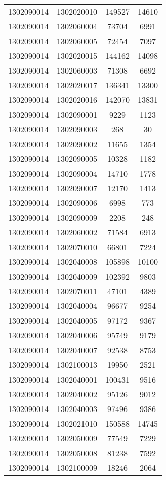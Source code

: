 \begin{longtable}[h]{llcc}
		1302090014 & 1302020010 & 149527 & 14610\\
		1302090014 & 1302060004 & 73704 & 6991\\
		1302090014 & 1302060005 & 72454 & 7097\\
		1302090014 & 1302020015 & 144162 & 14098\\
		1302090014 & 1302060003 & 71308 & 6692\\
		1302090014 & 1302020017 & 136341 & 13300\\
		1302090014 & 1302020016 & 142070 & 13831\\
		1302090014 & 1302090001 & 9229 & 1123\\
		1302090014 & 1302090003 & 268 & 30\\
		1302090014 & 1302090002 & 11655 & 1354\\
		1302090014 & 1302090005 & 10328 & 1182\\
		1302090014 & 1302090004 & 14710 & 1778\\
		1302090014 & 1302090007 & 12170 & 1413\\
		1302090014 & 1302090006 & 6998 & 773\\
		1302090014 & 1302090009 & 2208 & 248\\
		1302090014 & 1302060002 & 71584 & 6913\\
		1302090014 & 1302070010 & 66801 & 7224\\
		1302090014 & 1302040008 & 105898 & 10100\\
		1302090014 & 1302040009 & 102392 & 9803\\
		1302090014 & 1302070011 & 47101 & 4389\\
		1302090014 & 1302040004 & 96677 & 9254\\
		1302090014 & 1302040005 & 97172 & 9367\\
		1302090014 & 1302040006 & 95749 & 9179\\
		1302090014 & 1302040007 & 92538 & 8753\\
		1302090014 & 1302100013 & 19950 & 2521\\
		1302090014 & 1302040001 & 100431 & 9516\\
		1302090014 & 1302040002 & 95126 & 9012\\
		1302090014 & 1302040003 & 97496 & 9386\\
		1302090014 & 1302021010 & 150588 & 14745\\
		1302090014 & 1302050009 & 77549 & 7229\\
		1302090014 & 1302050008 & 81238 & 7592\\
		1302090014 & 1302100009 & 18246 & 2064\\

\end{longtable}
